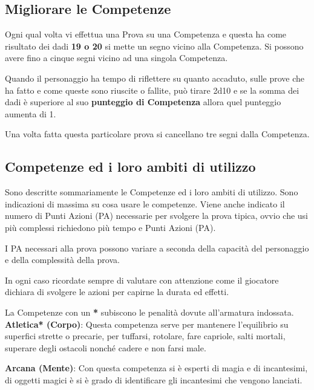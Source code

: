 \documentclass[12pt,a4paper,twoside,openany]{book}
\begin{document}
\begin{multicols}{2}
\subsection{Migliorare le Competenze}\hypertarget{Migliorare le Competenze}{} \label{Migliorare le Competenze}

Ogni qual volta vi effettua una Prova su una Competenza e questa ha come risultato dei dadi \textbf{19 o 20} si mette un segno vicino alla Competenza. Si possono avere fino a cinque segni vicino ad una singola Competenza.

Quando il personaggio ha tempo di riflettere su quanto accaduto, sulle prove che ha fatto e come queste sono riuscite o fallite, può tirare 2d10 e se la somma dei dadi è superiore al suo \textbf{punteggio di Competenza} allora quel punteggio aumenta di 1.

Una volta fatta questa particolare prova si cancellano tre segni dalla Competenza.	

\subsection{Competenze ed i loro ambiti di utilizzo}\label{competenzeambitidiutilizzo}

Sono descritte sommariamente le Competenze ed i loro ambiti di utilizzo. Sono indicazioni di massima su cosa usare le competenze. Viene anche indicato il numero di Punti Azioni (PA) necessarie per svolgere la prova tipica, ovvio che usi più complessi richiedono più tempo e Punti Azioni (PA).

I PA necessari alla prova possono variare a seconda della capacità del personaggio e della complessità della prova.

In ogni caso ricordate sempre di valutare con attenzione come il giocatore dichiara di svolgere le azioni per capirne la durata ed effetti. 

La Competenze con un \textbf{*} subiscono le penalità dovute all'armatura indossata.\\

\textbf{Atletica* (Corpo)}: Questa competenza serve per mantenere l'equilibrio su superfici strette o precarie, per tuffarsi, rotolare, fare capriole, salti mortali, superare degli ostacoli nonché cadere e non farsi male. 

\textbf{Arcana (Mente)}: Con questa competenza si è esperti di magia e di incantesimi, di oggetti magici è si è grado di identificare gli incantesimi che vengono lanciati. 


\end{multicols}
\end{document}
